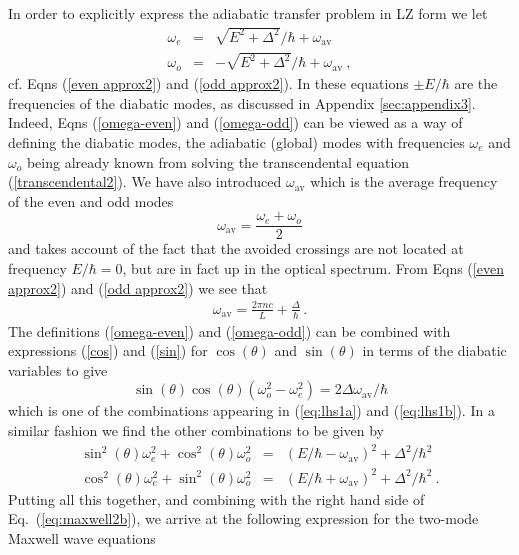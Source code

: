 \documentclass[twocolumn,english,pra,aps,superscriptaddress,floatfix]{revtex4-1}
\begin{document}
In order to explicitly express the adiabatic transfer problem in LZ form we let
\begin{eqnarray}
\omega_{e} & = & \sqrt{E^{2}+\Delta^{2}}/\hbar+\omega_{\mathrm{av}}
\label{omega-even} \\
\omega_{o} & = &-\sqrt{E^{2}+\Delta^{2}}/\hbar+\omega_{\mathrm{av}} \ ,
\label{omega-odd}
\end{eqnarray}
cf. Eqns (\ref{even approx2}) and (\ref{odd approx2}).
In these equations $\pm E/\hbar$ are the frequencies of the diabatic modes, as discussed in Appendix \ref{sec:appendix3}. Indeed, Eqns (\ref{omega-even}) and (\ref{omega-odd}) can be viewed as a way of defining the diabatic modes, the adiabatic (global) modes with frequencies $\omega_{e}$ and $\omega_{o}$ being already known from solving the transcendental equation (\ref{transcendental2}).  We have also introduced $\omega_{\mathrm{av}}$ which is the average frequency of the even and odd modes 
\begin{equation}
 \omega_{\mathrm{av}} = \frac{\omega_{e}+\omega_{o}}{2}
\label{omega-average}
\end{equation}
and takes account of the fact that the avoided crossings are not located at frequency $E/\hbar=0$, but are in fact up in the optical spectrum. From Eqns (\ref{even approx2}) and (\ref{odd approx2}) we see that 
\begin{eqnarray} 
\omega_{\mathrm{av}} = \frac{2\pi n c}{L} + \frac{\Delta}{\hbar } \, .
\end{eqnarray}  
The definitions (\ref{omega-even}) and (\ref{omega-odd}) can be combined with expressions (\ref{cos}) and (\ref{sin}) for  $\cos (\theta)$ and $\sin (\theta)$ in terms of the diabatic variables to give
\begin{equation}
\sin (\theta) \cos (\theta) \left( \omega_{o}^2-\omega_{e}^2 \right)= 2 \Delta \omega_{\mathrm{av}}/\hbar  
\end{equation}
which is one of the combinations appearing in (\ref{eq:lhs1a}) and (\ref{eq:lhs1b}). In a similar fashion we find the other combinations to be given by
\begin{eqnarray}
 \sin^{2}(\theta) \omega_{e}^2+\cos^{2} (\theta) \omega_{o}^2 &=& (E/\hbar-\omega_{\mathrm{av}})^2+\Delta^2/\hbar^{2} \\
 \cos^{2}(\theta) \omega_{e}^2+\sin^{2} (\theta) \omega_{o}^2 &=& (E/\hbar+\omega_{\mathrm{av}})^2+\Delta^2/\hbar^{2} \ .
\end{eqnarray} 
Putting all this together, and combining with the right hand side of Eq.\ (\ref{eq:maxwell2b}), we arrive at the following expression for the two-mode Maxwell wave equations
\end{document}
